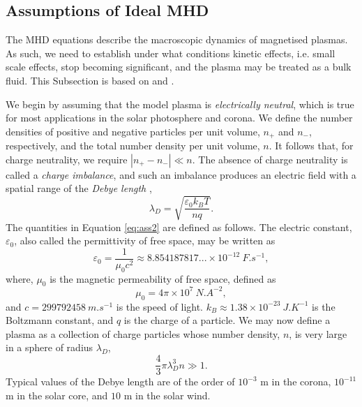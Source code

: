 \subsection{Assumptions of Ideal MHD}
\label{subsec:assumpt}

The MHD equations describe the macroscopic dynamics of magnetised plasmas.
As such, we need to establish under what conditions kinetic effects, i.e. small scale effects, stop becoming significant, and the plasma may be treated as a bulk fluid.
This Subsection is based on \cite{Goedbloed2004} and \cite{Priest2014}.

We begin by assuming that the model plasma is \textit{electrically neutral}, which is true for most applications in the solar photosphere and corona.
We define the number densities of positive and negative particles per unit volume, $n_+$ and $n_-$, respectively, and the total number density per unit volume, $n$.
It follows that, for charge neutrality, we require
$
|n_+ - n_-| \ll n.
$
The absence of charge neutrality is called a \textit{charge imbalance}, and such an imbalance produces an electric field with a spatial range of the \textit{Debye length} \citep[see, for example,][]{Boyd2003},
%
\begin{equation}
\label{eq:ass2}
\lambda_D = \sqrt{\frac{\varepsilon_0 k_B T}{n q}}.
\end{equation}
%
The quantities in Equation \eqref{eq:ass2} are defined as follows.
The electric constant, $\varepsilon_0$, also called the permittivity of free space, may be written as
%
\begin{equation}
\label{eq:electricconst}
\varepsilon_0 = \frac{1}{\mu_0 c^2} \approx 8.854187817... \times 10^{-12} \: \si{F.s^{-1}},
\end{equation}
%
where, $\mu_0$ is the magnetic permeability of free space, defined as
%
\begin{equation}
\label{eq:magneticconst}
\mu_0 = 4 \pi \times 10^7 \: \si{N.A^{-2}},
\end{equation}
%
and $c = \num{299792458} \: \si{m.s^{-1}}$ is the speed of light.
$k_B \approx 1.38 \times 10^{-23} \: \si{J.K^{-1}}$ is the Boltzmann constant, and $q$ is the charge of a particle.
We may now define a plasma as a collection of charge particles whose number density, $n$, is very large in a sphere of radius $\lambda_D$,
%
\begin{equation}
\label{eq:debye}
\frac{4}{3} \pi \lambda_D^3 n \gg 1.
\end{equation}
%
Typical values of the Debye length are of the order of $10^{-3}$ \si{m} in the corona, $10^{-11}$ \si{m} in the solar core, and $10$ \si{m} in the solar wind.

